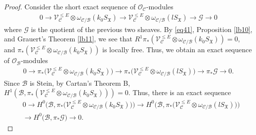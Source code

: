 \documentclass[11pt,b5paper,notitlepage]{article}
\theoremstyle{definition}
\theoremstyle{plain}
\newcommand{\fk}{\mathfrak}
\newcommand{\mc}{\mathcal}
\newcommand{\scr}{\mathscr}
\numberwithin{equation}{section}
\begin{document}
\begin{proof}
	
Consider the short exact sequence of $\scr O_{\mc C}$-modules
	\begin{align*}
	0\rightarrow \scr V_{\mc C}^{\leq E}\otimes\omega_{\mc C/\mc B}(k_0S_{\fk X})\rightarrow \scr V_{\mc C}^{\leq E}\otimes\omega_{\mc C/\mc B}(lS_{\fk X})\rightarrow\scr G\rightarrow 0
	\end{align*}
	where $\scr G$ is the quotient of the previous two sheaves. By \eqref{eq41}, Proposition \ref{lb10}, and Grauert's Theorem \ref{lb11}, we see that $R^1\pi_*(\scr V_{\mc C}^{\leq E}\otimes\omega_{\mc C/\mc B}(k_0S_{\fk X}))=0$, and $\pi_*(\scr V_{\mc C}^{\leq E}\otimes\omega_{\mc C/\mc B}(k_0S_{\fk X}))$ is locally free. Thus, we obtain an exact sequence of $\scr O_{\mc B}$-modules
	\begin{align*}
	0\rightarrow \pi_*\big(\scr V_{\mc C}^{\leq E}\otimes\omega_{\mc C/\mc B}(k_0S_{\fk X})\big)\rightarrow \pi_*\big(\scr V_{\mc C}^{\leq E}\otimes\omega_{\mc C/\mc B}(lS_{\fk X})\big)\rightarrow \pi_*\scr G\rightarrow 0.
	\end{align*}
Since $\mc B$ is Stein, by Cartan's Theorem B, $H^1(\mc B,\pi_*(\scr V_{\mc C}^{\leq E}\otimes\omega_{\mc C/\mc B}(k_0S_{\fk X})))=0$. Thus, there is an exact sequence
	\begin{align}
	&0\rightarrow H^0\big(\mc B,\pi_*\big(\scr V_{\mc C}^{\leq E}\otimes\omega_{\mc C/\mc B}(k_0S_{\fk X})\big)\big)\rightarrow H^0\big(\mc B,\pi_*\big(\scr V_{\mc C}^{\leq E}\otimes\omega_{\mc C/\mc B}(lS_{\fk X})\big)\big)\nonumber\\
	&\rightarrow H^0\big(\mc B,\pi_*\scr G\big)\rightarrow 0. \label{eq43}
	\end{align}
	

\end{proof}
\end{document}
